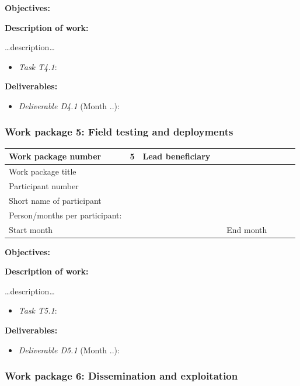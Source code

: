 \documentclass[]{article}
\providecommand{\tightlist}{%
  \setlength{\itemsep}{0pt}\setlength{\parskip}{0pt}}
\begin{document}
\textbf{Objectives:}

\textbf{Description of work:}

\ldots{}description\ldots{}

\begin{itemize}
\tightlist
\item
  \emph{Task T4.1}:
\end{itemize}

\textbf{Deliverables:}

\begin{itemize}
\tightlist
\item
  \emph{Deliverable D4.1} (Month ..):
\end{itemize}

\hypertarget{work-package-5-field-testing-and-deployments}{%
\subsubsection{Work package 5: Field testing and
deployments}\label{work-package-5-field-testing-and-deployments}}

\begin{longtable}[]{@{}llllllll@{}}
\toprule
Work package number & 5 & Lead beneficiary & & & & &\tabularnewline
\midrule
\endhead
Work package title & & & & & & &\tabularnewline
Participant number & & & & & & &\tabularnewline
Short name of participant & & & & & & &\tabularnewline
Person/months per participant: & & & & & & &\tabularnewline
Start month & & & & End month & & &\tabularnewline
\bottomrule
\end{longtable}

\textbf{Objectives:}

\textbf{Description of work:}

\ldots{}description\ldots{}

\begin{itemize}
\tightlist
\item
  \emph{Task T5.1}:
\end{itemize}

\textbf{Deliverables:}

\begin{itemize}
\tightlist
\item
  \emph{Deliverable D5.1} (Month ..):
\end{itemize}

\hypertarget{work-package-6-dissemination-and-exploitation}{%
\subsubsection{Work package 6: Dissemination and
exploitation}\label{work-package-6-dissemination-and-exploitation}}
\end{document}
